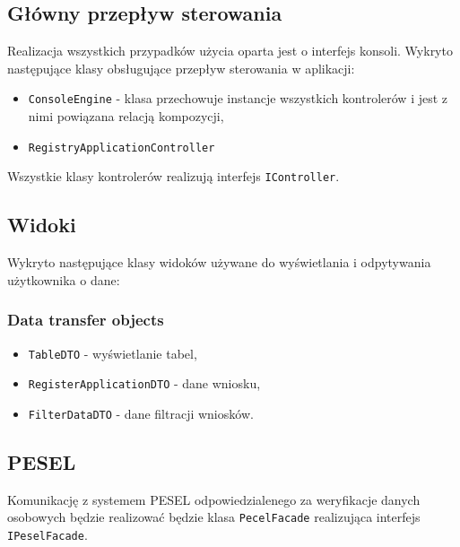 \documentclass[12pt]{article}
\begin{document}
\subsection{Główny przepływ sterowania}
Realizacja wszystkich przypadków użycia oparta jest o interfejs konsoli. 
Wykryto następujące klasy obsługujące przepływ sterowania w aplikacji:
\begin{itemize}[noitemsep]
    \item \lstinline{ConsoleEngine} - klasa przechowuje instancje wszystkich kontrolerów i jest z nimi powiązana relacją kompozycji,
    \item \lstinline{RegistryApplicationController}
\end{itemize}
Wszystkie klasy kontrolerów realizują interfejs \lstinline{IController}.

\subsection{Widoki}
Wykryto następujące klasy widoków używane do wyświetlania i odpytywania użytkownika o dane:
\subsubsection{Data transfer objects}

\begin{itemize}[noitemsep]
    \item \lstinline{TableDTO} - wyświetlanie tabel,
    \item \lstinline{RegisterApplicationDTO} - dane wniosku,
    \item \lstinline{FilterDataDTO} - dane filtracji wniosków.
\end{itemize}

\subsection{PESEL}
Komunikację z systemem PESEL odpowiedzialenego za weryfikacje danych osobowych będzie realizować będzie klasa \lstinline{PecelFacade} realizująca interfejs \lstinline{IPeselFacade}.
\end{document}
